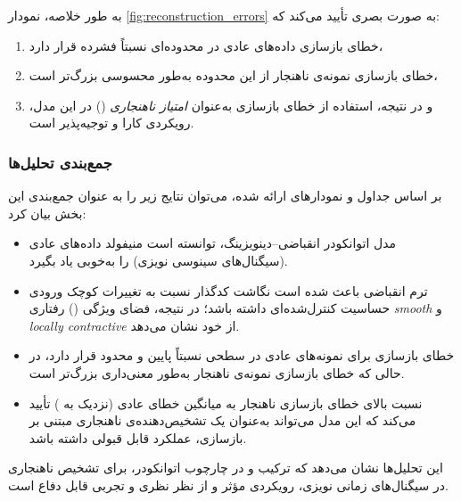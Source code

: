 \documentclass{article}
\begin{document}
به طور خلاصه، نمودار \ref{fig:reconstruction_errors} به صورت بصری تأیید می‌کند که:
\begin{enumerate}
	\item خطای بازسازی داده‌های عادی در محدوده‌ای نسبتاً فشرده قرار دارد،
	\item خطای بازسازی نمونه‌ی ناهنجار از این محدوده به‌طور محسوسی بزرگ‌تر است،
	\item و در نتیجه، استفاده از خطای بازسازی به‌عنوان \emph{امتیاز ناهنجاری} () در این مدل، رویکردی کارا و توجیه‌پذیر است.
\end{enumerate}

\subsubsection{جمع‌بندی تحلیل‌ها}

بر اساس جداول و نمودارهای ارائه شده، می‌توان نتایج زیر را به عنوان جمع‌بندی این بخش بیان کرد:

\begin{itemize}
	\item مدل اتوانکودر انقباضی–دینویزینگ، توانسته است منیفولد داده‌های عادی (سیگنال‌های سینوسی نویزی) را به‌خوبی یاد بگیرد.
	\item ترم انقباضی باعث شده است نگاشت کدگذار نسبت به تغییرات کوچک ورودی حساسیت کنترل‌شده‌ای داشته باشد؛ در نتیجه، فضای ویژگی () رفتاری \emph{smooth} و \emph{locally contractive} از خود نشان می‌دهد.
	\item خطای بازسازی برای نمونه‌های عادی در سطحی نسبتاً پایین و محدود قرار دارد، در حالی که خطای بازسازی نمونه‌ی ناهنجار به‌طور معنی‌داری بزرگ‌تر است.
	\item نسبت بالای خطای بازسازی ناهنجار به میانگین خطای عادی (نزدیک به ) تأیید می‌کند که این مدل می‌تواند به‌عنوان یک تشخیص‌دهنده‌ی ناهنجاری مبتنی بر بازسازی، عملکرد قابل قبولی داشته باشد.
\end{itemize}

این تحلیل‌ها نشان می‌دهد که ترکیب  و در چارچوب اتوانکودر، برای تشخیص ناهنجاری در سیگنال‌های زمانی نویزی، رویکردی مؤثر و از نظر نظری و تجربی قابل دفاع است.
\end{document}
